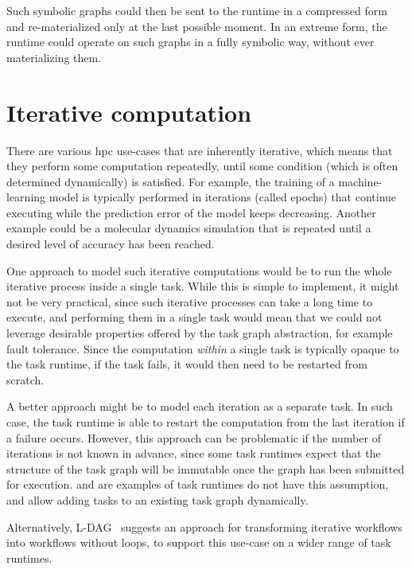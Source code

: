\begin{description}[wide=0pt]
		Such symbolic graphs could then be sent to the runtime in a compressed form and re-materialized
		only at the last possible moment. In an extreme form, the runtime could operate on such graphs in a
		fully symbolic way, without ever materializing them.
\end{description}

\section{Iterative computation}
There are various \gls{hpc} use-cases that are inherently iterative, which means that
they perform some computation repeatedly, until some condition (which is often determined
dynamically) is satisfied. For example, the training of a machine-learning model is typically
performed in iterations (called epochs) that continue executing while the prediction error of the
model keeps decreasing. Another example could be a molecular dynamics simulation that is repeated
until a desired level of accuracy has been reached.

One approach to model such iterative computations would be to run the whole iterative process
inside a single task. While this is simple to implement, it might not be very practical, since such
iterative processes can take a long time to execute, and performing them in a single task would
mean that we could not leverage desirable properties offered by the task graph abstraction, for
example fault tolerance. Since the computation \emph{within} a single task is typically
opaque to the task runtime, if the task fails, it would then need to be restarted from scratch.

A better approach might be to model each iteration as a separate task. In such case, the task
runtime is able to restart the computation from the last iteration if a failure occurs. However,
this approach can be problematic if the number of iterations is not known in advance, since some
task runtimes expect that the structure of the task graph will be immutable once the graph has been
submitted for execution. \dask{} and \ray{} are examples of task
runtimes do not have this assumption, and allow adding tasks to an existing task graph dynamically.

Alternatively, \textsc{L-DAG}~\cite{l-dag} suggests an approach for
transforming iterative workflows into workflows without loops, to support this use-case on a wider
range of task runtimes.

